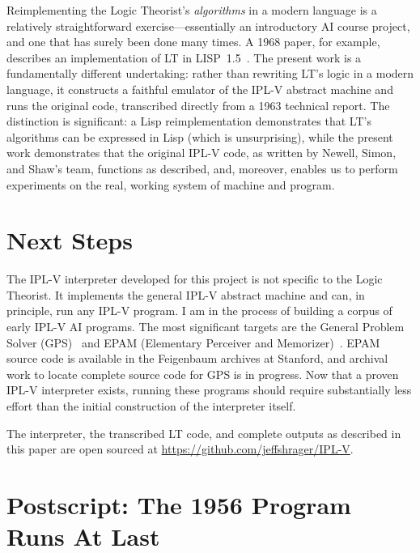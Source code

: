 \documentclass[journal]{IEEEtran}
\begin{document}
Reimplementing the Logic Theorist's \textit{algorithms} in a modern
language is a relatively straightforward exercise---essentially an
introductory AI course project, and one that has surely been done many
times. A 1968 paper, for example, describes an implementation of LT in
LISP~1.5~\cite{millstein1968logic}. The present work is a
fundamentally different undertaking: rather than rewriting LT's logic
in a modern language, it constructs a faithful emulator of the IPL-V
abstract machine and runs the original code, transcribed directly from
a 1963 technical report. The distinction is significant: a Lisp
reimplementation demonstrates that LT's algorithms can be expressed in
Lisp (which is unsurprising), while the present work demonstrates that
the original IPL-V code, as written by Newell, Simon, and Shaw's team,
functions as described, and, moreover, enables us to perform
experiments on the real, working system of machine and program.

\section{Next Steps}
\label{sec:next}

The IPL-V interpreter developed for this project is not specific to
the Logic Theorist. It implements the general IPL-V abstract machine
and can, in principle, run any IPL-V program. I am in the process of
building a corpus of early IPL-V AI programs. The most significant
targets are the General Problem Solver (GPS)~\cite{newell1959gps} and
EPAM (Elementary Perceiver and
Memorizer)~\cite{feigenbaum1961epam}. EPAM source code is available in
the Feigenbaum archives at Stanford, and archival work to locate
complete source code for GPS is in progress. Now that a proven IPL-V
interpreter exists, running these programs should require
substantially less effort than the initial construction of the
interpreter itself.

The interpreter, the transcribed LT code, and complete outputs as
described in this paper are open sourced at
\url{https://github.com/jeffshrager/IPL-V}.

\section{Postscript: The 1956 Program Runs At Last}
\label{sec:postscript}

\end{document}
